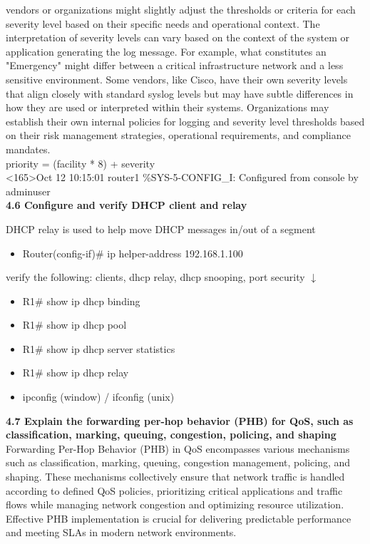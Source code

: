 \documentclass{article}
\begin{document}
vendors or organizations might slightly adjust the thresholds or criteria for each severity level based on their specific needs and operational context. The interpretation of severity levels can vary based on the context of the system or application generating the log message. For example, what constitutes an "Emergency" might differ between a critical infrastructure network and a less sensitive environment. Some vendors, like Cisco, have their own severity levels that align closely with standard syslog levels but may have subtle differences in how they are used or interpreted within their systems. Organizations may establish their own internal policies for logging and severity level thresholds based on their risk management strategies, operational requirements, and compliance mandates.\\
	
	priority = (facility * 8) + severity\\
	
	\textless 165\textgreater Oct 12 10:15:01 router1 \%SYS-5-CONFIG\_I: Configured from console by adminuser\\
	
  
\noindent\textbf{4.6 Configure and verify DHCP client and relay}

DHCP relay is used to help move DHCP messages in/out of a segment
\begin{itemize}
\item Router(config-if)\# ip helper-address 192.168.1.100
\end{itemize}
		
verify the following: clients, dhcp relay, dhcp snooping, port security $\downarrow$
\begin{itemize}
\item R1\# show ip dhcp binding
\item R1\# show ip dhcp pool
\item R1\# show ip dhcp server statistics
\item R1\# show ip dhcp relay
\item ipconfig (window) / ifconfig (unix)
\end{itemize}
		
\noindent\textbf{4.7 Explain the forwarding per-hop behavior (PHB) for QoS, such as classification, marking, queuing, congestion, policing, and shaping}\\

	Forwarding Per-Hop Behavior (PHB) in QoS encompasses various mechanisms such as classification, marking, queuing, congestion management, policing, and shaping. These mechanisms collectively ensure that network traffic is handled according to defined QoS policies, prioritizing critical applications and traffic flows while managing network congestion and optimizing resource utilization. Effective PHB implementation is crucial for delivering predictable performance and meeting SLAs in modern network environments.\\
	
\end{document}
